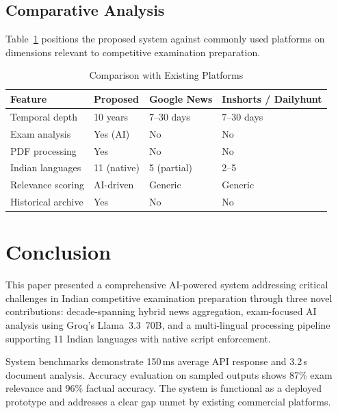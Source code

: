 \documentclass[conference]{IEEEtran}
\begin{document}
\subsection{Comparative Analysis}
Table~\ref{tab:compare} positions the proposed system against commonly used platforms on dimensions relevant to competitive examination preparation.

\begin{table}[!t]
\renewcommand{\arraystretch}{1.2}
\caption{Comparison with Existing Platforms}
\label{tab:compare}
\centering
\small
\begin{tabular}{@{}p{2.0cm}p{1.3cm}p{1.2cm}p{1.6cm}@{}}
\toprule
\textbf{Feature} & \textbf{Proposed} & \textbf{Google News} & \textbf{Inshorts / Dailyhunt} \\
\midrule
Temporal depth      & 10 years    & 7–30 days   & 7–30 days   \\
Exam analysis       & Yes (AI)    & No          & No          \\
PDF processing      & Yes         & No          & No          \\
Indian languages    & 11 (native) & 5 (partial) & 2–5         \\
Relevance scoring   & AI-driven   & Generic     & Generic     \\
Historical archive  & Yes         & No          & No          \\
\bottomrule
\end{tabular}
\end{table}

\section{Conclusion}

This paper presented a comprehensive AI-powered system addressing critical challenges in Indian competitive examination preparation through three novel contributions: decade-spanning hybrid news aggregation, exam-focused AI analysis using Groq's Llama~3.3~70B, and a multi-lingual processing pipeline supporting 11 Indian languages with native script enforcement.

System benchmarks demonstrate 150\,ms average API response and 3.2\,s document analysis. Accuracy evaluation on sampled outputs shows 87\% exam relevance and 96\% factual accuracy. The system is functional as a deployed prototype and addresses a clear gap unmet by existing commercial platforms.
\end{document}
